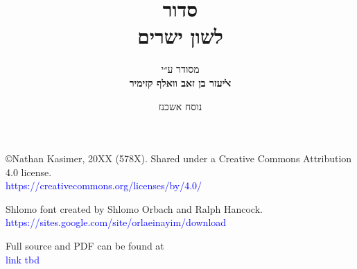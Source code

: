 \documentclass[twoside, openany, parskip=half, 11pt]{book}
\begin{document}
\title{  סדור \\
לשון ישרים
\vspace{.5in}
}

\author{מסודר ע״י
\\
\textbf{ﭏיעזר בן זאב וואלף קזימיר}}
\date{נוסח אשכנז}

\maketitle

\begin{minipage}{\textwidth}
\begin{english}
\raggedright

©Nathan Kasimer, 20XX (578X). Shared under a Creative Commons Attribution 4.0 license.\\
\textcolor{blue}{https://creativecommons.org/licenses/by/4.0/}\\ \vspace{\baselineskip}


Shlomo font created by Shlomo Orbach and Ralph Hancock.\\ \textcolor{blue}{https://sites.google.com/site/orlaeinayim/download}\\ \vspace{\baselineskip}

Full \XeLaTeX \quad source and PDF can be found at\\ \textcolor{blue}{link tbd}\\ \vspace{\baselineskip}


\end{english}
\end{minipage}
\end{document}
